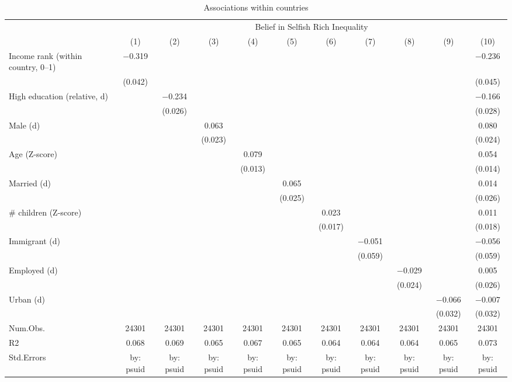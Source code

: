 \begin{table}

\caption{\label{tab:unnamed-chunk-50}Associations within countries}
\centering
\begin{tabular}[t]{lcccccccccc}
\toprule
\multicolumn{1}{c}{ } & \multicolumn{10}{c}{Belief in Selfish Rich Inequality} \\
\cmidrule(l{3pt}r{3pt}){2-11}
  & (1) & (2) & (3) & (4) & (5) & (6) & (7) & (8) & (9) & (10)\\
\midrule
Income rank (within country, 0--1) & \num{-0.319} &  &  &  &  &  &  &  &  & \num{-0.236}\\
 & (\num{0.042}) &  &  &  &  &  &  &  &  & (\num{0.045})\\
High education (relative, d) &  & \num{-0.234} &  &  &  &  &  &  &  & \num{-0.166}\\
 &  & (\num{0.026}) &  &  &  &  &  &  &  & (\num{0.028})\\
Male (d) &  &  & \num{0.063} &  &  &  &  &  &  & \num{0.080}\\
 &  &  & (\num{0.023}) &  &  &  &  &  &  & (\num{0.024})\\
Age (Z-score) &  &  &  & \num{0.079} &  &  &  &  &  & \num{0.054}\\
 &  &  &  & (\num{0.013}) &  &  &  &  &  & (\num{0.014})\\
Married (d) &  &  &  &  & \num{0.065} &  &  &  &  & \num{0.014}\\
 &  &  &  &  & (\num{0.025}) &  &  &  &  & (\num{0.026})\\
\# children (Z-score) &  &  &  &  &  & \num{0.023} &  &  &  & \num{0.011}\\
 &  &  &  &  &  & (\num{0.017}) &  &  &  & (\num{0.018})\\
Immigrant (d) &  &  &  &  &  &  & \num{-0.051} &  &  & \num{-0.056}\\
 &  &  &  &  &  &  & (\num{0.059}) &  &  & (\num{0.059})\\
Employed (d) &  &  &  &  &  &  &  & \num{-0.029} &  & \num{0.005}\\
 &  &  &  &  &  &  &  & (\num{0.024}) &  & (\num{0.026})\\
Urban (d) &  &  &  &  &  &  &  &  & \num{-0.066} & \num{-0.007}\\
 &  &  &  &  &  &  &  &  & (\num{0.032}) & (\num{0.032})\\
\midrule
Num.Obs. & \num{24301} & \num{24301} & \num{24301} & \num{24301} & \num{24301} & \num{24301} & \num{24301} & \num{24301} & \num{24301} & \num{24301}\\
R2 & \num{0.068} & \num{0.069} & \num{0.065} & \num{0.067} & \num{0.065} & \num{0.064} & \num{0.064} & \num{0.064} & \num{0.065} & \num{0.073}\\
Std.Errors & by: psuid & by: psuid & by: psuid & by: psuid & by: psuid & by: psuid & by: psuid & by: psuid & by: psuid & by: psuid\\
\bottomrule
\end{tabular}
\end{table}